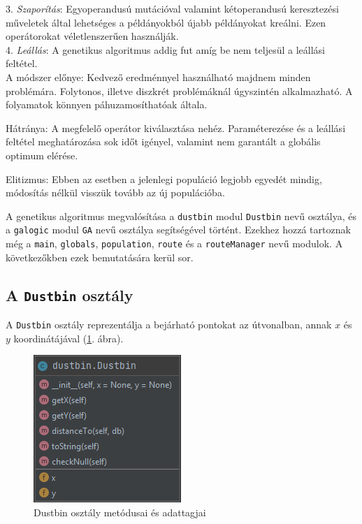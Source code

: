 3. \textit{Szaporítás}: Egyoperandusú mutációval valamint kétoperandusú keresztezési mű\-veletek által lehetséges a példányokból újabb példányokat kreálni. Ezen operátorokat véletlenszerűen használják. \\

4. \textit{Leállás}: A genetikus algoritmus addig fut amíg be nem teljesül a leállási feltétel.\\

A módszer előnye: Kedvező eredménnyel használható majdnem minden problémára. Folytonos, illetve diszkrét problémáknál úgyszintén alkalmazható. A folyamatok könnyen páhuzamosíthatóak általa.

Hátránya: A megfelelő operátor kiválasztása nehéz. Paraméterezése és a leállási feltétel meghatározása sok időt igényel, valamint nem garantált a globális optimum elérése.

Elitizmus: Ebben az esetben a jelenlegi populáció legjobb egyedét mindig, módosítás nélkül visszük tovább az új populációba.


A genetikus algoritmus megvalósítása a \texttt{dustbin} modul \texttt{Dustbin} nevű osztálya, és a \texttt{galogic} modul \texttt{GA} nevű osztálya segítségével történt.
Ezekhez hozzá tartoznak még a \texttt{main}, \texttt{globals}, \texttt{population}, \texttt{route} és a \texttt{routeManager} nevű modulok.
A következőkben ezek bemutatására kerül sor.

\subsection{A \texttt{Dustbin} osztály}

A \texttt{Dustbin} osztály reprezentálja a bejárható pontokat az útvonalban, annak $x$ és $y$ koordinátájával (\ref{fig:dustbin}. ábra).\cite{Python}

\begin{figure}[!htb]
\centering
\includegraphics[scale=0.7]{images/dustbin.png}
\caption{Dustbin osztály metódusai és adattagjai}
\label{fig:dustbin}
\end{figure}

